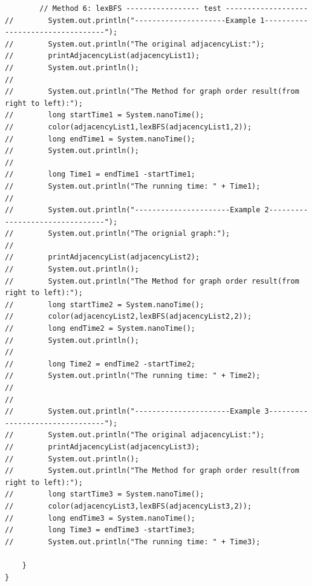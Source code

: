 \documentclass{article}
\begin{document}
\begin{verbatim}
        // Method 6: lexBFS ----------------- test -------------------
//        System.out.println("---------------------Example 1---------------------------------");
//        System.out.println("The original adjacencyList:");
//        printAdjacencyList(adjacencyList1);
//        System.out.println();
//
//        System.out.println("The Method for graph order result(from right to left):");
//        long startTime1 = System.nanoTime();
//        color(adjacencyList1,lexBFS(adjacencyList1,2));
//        long endTime1 = System.nanoTime();
//        System.out.println();
//
//        long Time1 = endTime1 -startTime1;
//        System.out.println("The running time: " + Time1);
//
//        System.out.println("----------------------Example 2--------------------------------");
//        System.out.println("The orignial graph:");
//
//        printAdjacencyList(adjacencyList2);
//        System.out.println();
//        System.out.println("The Method for graph order result(from right to left):");
//        long startTime2 = System.nanoTime();
//        color(adjacencyList2,lexBFS(adjacencyList2,2));
//        long endTime2 = System.nanoTime();
//        System.out.println();
//
//        long Time2 = endTime2 -startTime2;
//        System.out.println("The running time: " + Time2);
//
//
//        System.out.println("----------------------Example 3--------------------------------");
//        System.out.println("The original adjacencyList:");
//        printAdjacencyList(adjacencyList3);
//        System.out.println();
//        System.out.println("The Method for graph order result(from right to left):");
//        long startTime3 = System.nanoTime();
//        color(adjacencyList3,lexBFS(adjacencyList3,2));
//        long endTime3 = System.nanoTime();
//        long Time3 = endTime3 -startTime3;
//        System.out.println("The running time: " + Time3);

    }
}



\end{verbatim}
\end{document}

